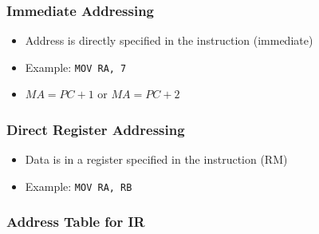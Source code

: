 \begin{frame}
    \frametitle{Immediate Addressing}
    \begin{itemize}
        \item Address is directly specified in the instruction (immediate)
        \item Example: \texttt{MOV RA, 7}
        \item $MA = PC + 1$ or $MA = PC + 2$
    \end{itemize}
\end{frame}

\begin{frame}
    \frametitle{Direct Register Addressing}
    \begin{itemize}
        \item Data is in a register specified in the instruction (RM)
        \item Example: \texttt{MOV RA, RB}
    \end{itemize}
\end{frame}

\begin{frame}
    \frametitle{Address Table for IR}
    \begin{table}[]
    \end{table}
\end{frame}

